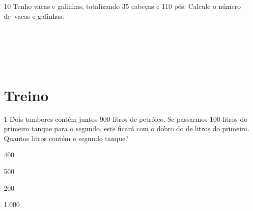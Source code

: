 \num{10} Tenho vacas e galinhas, totalizando 35 cabeças e 110 pés. Calcule o
número de~vacas e galinhas.


\\

\\

\\

\\

\section{Treino}


\num{1} Dois tambores contêm juntos 900 litros de petróleo. Se passarmos 100
litros do primeiro tanque para o segundo, este ficará com o dobro do de
litros do primeiro. Quantos litros contém o segundo tanque?

\begin{escolha}
\item 400
\item 500
\item 200
\item 1.000
\end{escolha}









